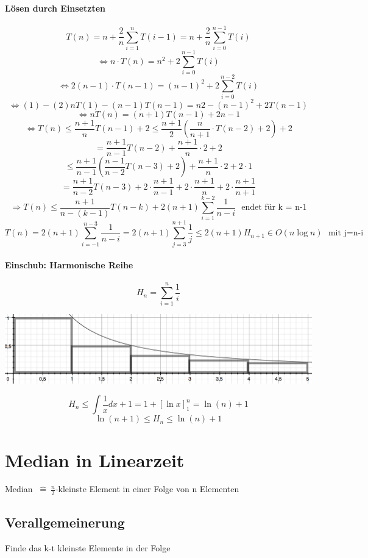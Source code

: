 \paragraph{Lösen durch Einsetzten}
\[T(n) = n + \frac{2}{n} \sum_{i=1}^n T(i-1) = n + \frac{2}{n} \sum_{i=0}^{n-1} T(i)\]
\[ \Leftrightarrow n \cdot T(n) = n^2 + 2 \sum_{i=0}^{n-1} T(i) \]
\[ \Leftrightarrow 2(n-1) \cdot T(n-1) = (n-1)^2 + 2 \sum_{i=0}^{n-2} T(i) \]
\[ \Leftrightarrow (1)-(2) n T(1)-(n-1) T(n-1) = n2 -(n-1)^2 + 2 T(n-1) \]
\[ \Leftrightarrow n T(n) = (n+1) T(n-1) + 2n-1 \]
\[ \Leftrightarrow T(n) \leq \frac{n+1}{n} T(n-1) + 2 \leq \frac{n+1}{2} \left(\frac{n}{n+1} \cdot T(n-2) + 2 \right) + 2 \]
\[ = \frac{n+1}{n-1} T(n-2) + \frac{n+1}{n} \cdot 2 + 2\]
\[ \leq \frac{n+1}{n-1} \left(\frac{n-1}{n-2} T(n-3) +2 \right) + \frac{n+1}{n} \cdot 2 + 2 \cdot 1\]
\[= \frac{n+1}{n-2} T(n-3) + 2 \cdot \frac{n+1}{n-1} + 2 \cdot \frac{n+1}{n} + 2 \cdot \frac{n+1}{n+1} \]
\[ \Rightarrow T(n) \leq \frac{n+1}{n-(k-1)} T(n-k) + 2(n+1) \sum_{i=1}^{k-2} \frac{1}{n-i} ~~~\text{endet für k = n-1}\]
\[ T(n) = 2(n+1) \sum_{i=-1}^{n-3} \frac{1}{n-i} = 2(n+1) \sum_{j=3}^{n+1} \frac{1}{j} \leq 2 (n+1) H_{n+1} \in O(n \log n) ~~~\text{mit j=n-i} \] 

\begin{mdframed}
\paragraph{Einschub: Harmonische Reihe}
\[ H_n = \sum_{i=1}^{n} \frac{1}{i} \]

\includegraphics[width=\linewidth]{06/Grafik/img4.png}


\[H_n \leq \int \frac{1}{x} dx +1 = 1 + [\ln x]_1^n = \ln(n)+1 \]
\[\ln(n+1) \leq H_n \leq \ln(n)+1 \]
\end{mdframed}

\pagebreak 

\section{Median in Linearzeit}
Median  $~\hat{=}~ \frac{n}{2} $-kleinste Element in einer Folge von n Elementen

\subsection*{Verallgemeinerung}
Finde das k-t kleinste Elemente in der Folge\\

